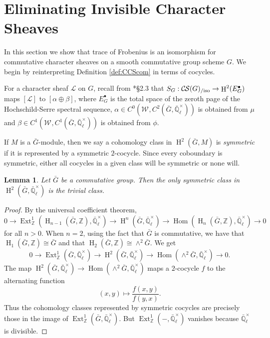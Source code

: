 \documentclass[10pt]{amsart}
\theoremstyle{plain}
\newtheorem{lemma}[theorem]{Lemma}
\theoremstyle{definition}
\newcommand{\ZZ}{{\mathbb{Z}}}
\newcommand{\EE}{\mathbb{\bar Q}_\ell}
\newcommand{\EEx}{\EE^\times}
\newcommand{\Weil}[1]{\mathcal{W}_{#1}}
\DeclareMathOperator{\Hom}{Hom}
\DeclareMathOperator{\Ext}{Ext}
\DeclareMathOperator{\Hh}{H}
\newcommand{\cs}[1]{{\mathcal{#1}}}
\newcommand{\CS}{{\mathcal{C\hskip-0.8pt S}}}
\newcommand{\CSiso}[1]{\CS(#1)_{/\text{iso}}}
\newcommand{\bG}{\bar{G}}
\begin{document}

\section{Eliminating Invisible Character Sheaves}\label{sec:defect}

In this section we show that trace of Frobenius is an isomorphism for commutative character sheaves on a
smooth commutative group scheme $G$.  We begin by reinterpreting Definition \ref{def:CCScom} in terms of
cocycles.

For a character sheaf $\cs{L}$ on $G$, recall from \cite{cunningham-roe:13a}*{\S 2.3} that $S_G : \CSiso{G} \to \Hh^2(E_G^\bullet)$ maps
$[\cs{L}]$ to $[\alpha \oplus \beta]$, where $E_G^\bullet$ is the total space of the zeroth page
of the Hochschild-Serre spectral sequence, $\alpha \in C^0(\Weil{}, C^2(\bG, \EEx))$ is obtained from $\mu$ and
$\beta \in C^1(\Weil{}, C^1(\bG, \EEx))$ is obtained from $\phi$.

If $M$ is a $\bG$-module, then we say a cohomology class in $\Hh^2(\bG, M)$ is \emph{symmetric} if it is represented
by a symmetric $2$-cocycle.  Since every coboundary is symmetric, either all cocycles in a given class will be symmetric
or none will.

\begin{lemma} \label{lem:symtriv}
Let $\bG$ be a commutative group.  Then the only symmetric class in $\Hh^2(\bG, \EEx)$ is the trivial class.
\end{lemma}

\begin{proof}
By the universal coefficient theorem,
\[
0 \to \Ext^1_\ZZ(\Hh_{n-1}(\bG, \ZZ), \EEx) \to \Hh^n(\bG, \EEx) \to \Hom(\Hh_n(\bG, \ZZ), \EEx) \to 0
\]
for all $n > 0$.  When $n = 2$, using the fact that $\bG$ is commutative, we have that $\Hh_1(\bG, \ZZ) \cong \bG$
and that $\Hh_2(\bG, \ZZ) \cong \wedge^2 \bG$. We get
\[
0 \to \Ext^1_\ZZ(\bG, \EEx) \to \Hh^2(\bG, \EEx) \to \Hom(\wedge^2 \bG, \EEx) \to 0.
\]
The map $\Hh^2(\bG, \EEx) \to \Hom(\wedge^2 \bG, \EEx)$ maps a $2$-cocycle $f$ to the alternating function
\[
(x,y) \mapsto \frac{f(x,y)}{f(y,x)}.
\]
Thus the cohomology classes represented by symmetric cocycles are precisely those in the image of $\Ext^1_\ZZ(\bG, \EEx)$.
But $\Ext^1_\ZZ(-, \EEx)$ vanishes because $\EEx$ is divisible.
\end{proof}
\end{document}
